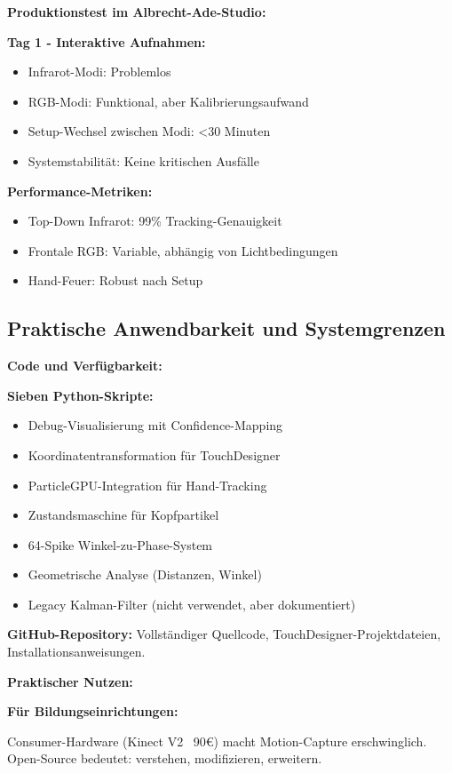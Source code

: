 \textbf{Produktionstest im Albrecht-Ade-Studio:}

\textbf{Tag 1 - Interaktive Aufnahmen:}
\begin{itemize}
    \item Infrarot-Modi: Problemlos
    \item RGB-Modi: Funktional, aber Kalibrierungsaufwand
    \item Setup-Wechsel zwischen Modi: <30 Minuten
    \item Systemstabilität: Keine kritischen Ausfälle
\end{itemize}

\textbf{Performance-Metriken:}
\begin{itemize}
    \item Top-Down Infrarot: 99\% Tracking-Genauigkeit
    \item Frontale RGB: Variable, abhängig von Lichtbedingungen
    \item Hand-Feuer: Robust nach Setup
\end{itemize}

\subsection{Praktische Anwendbarkeit und Systemgrenzen}

\textbf{Code und Verfügbarkeit:}

\textbf{Sieben Python-Skripte:}
\begin{itemize}
    \item Debug-Visualisierung mit Confidence-Mapping
    \item Koordinatentransformation für TouchDesigner
    \item ParticleGPU-Integration für Hand-Tracking
    \item Zustandsmaschine für Kopfpartikel
    \item 64-Spike Winkel-zu-Phase-System
    \item Geometrische Analyse (Distanzen, Winkel)
    \item Legacy Kalman-Filter (nicht verwendet, aber dokumentiert)
\end{itemize}

\textbf{GitHub-Repository:} Vollständiger Quellcode, TouchDesigner-Projektdateien, Installationsanweisungen.

\textbf{Praktischer Nutzen:}

\textbf{Für Bildungseinrichtungen:}
\raggedright Consumer-Hardware (Kinect V2 ~90€) macht Motion-Capture erschwinglich. Open-Source bedeutet: verstehen, modifizieren, erweitern.

